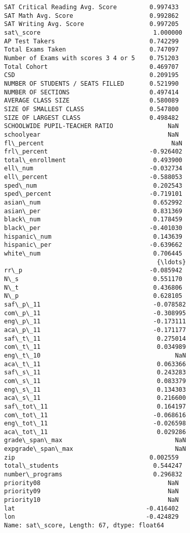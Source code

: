 \documentclass[11pt]{article}
\begin{document}
    \begin{Verbatim}[commandchars=\\\{\}]
SAT Critical Reading Avg. Score         0.997433
SAT Math Avg. Score                     0.992862
SAT Writing Avg. Score                  0.997205
sat\_score                               1.000000
AP Test Takers                          0.742299
Total Exams Taken                       0.747097
Number of Exams with scores 3 4 or 5    0.751203
Total Cohort                            0.469707
CSD                                     0.209195
NUMBER OF STUDENTS / SEATS FILLED       0.521990
NUMBER OF SECTIONS                      0.497414
AVERAGE CLASS SIZE                      0.580089
SIZE OF SMALLEST CLASS                  0.547800
SIZE OF LARGEST CLASS                   0.498482
SCHOOLWIDE PUPIL-TEACHER RATIO               NaN
schoolyear                                   NaN
fl\_percent                                   NaN
frl\_percent                            -0.926402
total\_enrollment                        0.493900
ell\_num                                -0.032734
ell\_percent                            -0.588053
sped\_num                                0.202543
sped\_percent                           -0.719101
asian\_num                               0.652992
asian\_per                               0.831369
black\_num                               0.178459
black\_per                              -0.401030
hispanic\_num                            0.143639
hispanic\_per                           -0.639662
white\_num                               0.706445
                                          {\ldots}   
rr\_p                                   -0.085942
N\_s                                     0.551170
N\_t                                     0.436806
N\_p                                     0.628105
saf\_p\_11                               -0.078582
com\_p\_11                               -0.308995
eng\_p\_11                               -0.173111
aca\_p\_11                               -0.171177
saf\_t\_11                                0.275014
com\_t\_11                                0.034989
eng\_t\_10                                     NaN
aca\_t\_11                                0.063366
saf\_s\_11                                0.243283
com\_s\_11                                0.083379
eng\_s\_11                                0.134303
aca\_s\_11                                0.216600
saf\_tot\_11                              0.164197
com\_tot\_11                             -0.068616
eng\_tot\_11                             -0.026598
aca\_tot\_11                              0.029286
grade\_span\_max                               NaN
expgrade\_span\_max                            NaN
zip                                     0.002559
total\_students                          0.544247
number\_programs                         0.296832
priority08                                   NaN
priority09                                   NaN
priority10                                   NaN
lat                                    -0.416402
lon                                    -0.424829
Name: sat\_score, Length: 67, dtype: float64

    \end{Verbatim}
\end{document}
